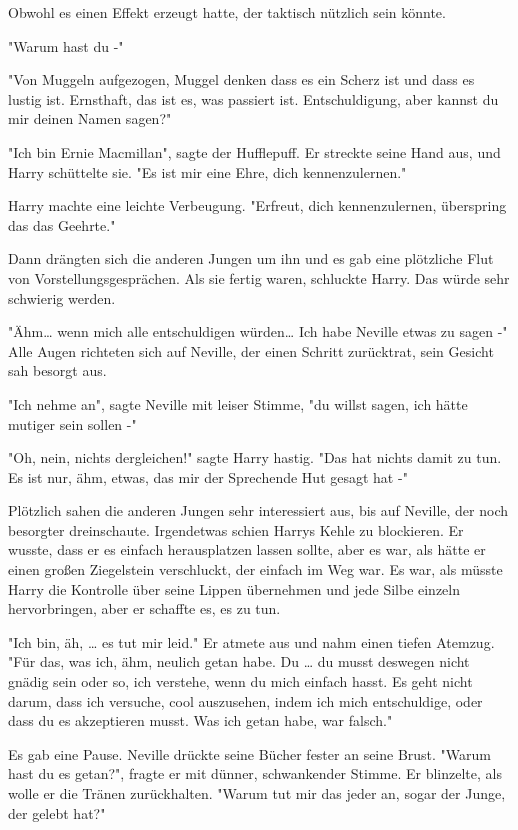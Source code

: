 {Obwohl es einen Effekt erzeugt hatte, der taktisch nützlich sein könnte.

"Warum hast du -"

"Von Muggeln aufgezogen, Muggel denken dass es ein Scherz ist und dass es lustig ist. Ernsthaft, das ist es, was passiert ist. Entschuldigung, aber kannst du mir deinen Namen sagen?"

"Ich bin Ernie Macmillan", sagte der Hufflepuff. Er streckte seine Hand aus, und Harry schüttelte sie. "Es ist mir eine Ehre, dich kennenzulernen."

Harry machte eine leichte Verbeugung. "Erfreut, dich kennenzulernen, überspring das das Geehrte."

Dann drängten sich die anderen Jungen um ihn und es gab eine plötzliche Flut von Vorstellungsgesprächen. Als sie fertig waren, schluckte Harry. Das würde sehr schwierig werden.

"Ähm… wenn mich alle entschuldigen würden… Ich habe Neville etwas zu sagen -" Alle Augen richteten sich auf Neville, der einen Schritt zurücktrat, sein Gesicht sah besorgt aus.

"Ich nehme an", sagte Neville mit leiser Stimme, "du willst sagen, ich hätte mutiger sein sollen -"

"Oh, nein, nichts dergleichen!" sagte Harry hastig. "Das hat nichts damit zu tun. Es ist nur, ähm, etwas, das mir der Sprechende Hut gesagt hat -"

Plötzlich sahen die anderen Jungen sehr interessiert aus, bis auf Neville, der noch besorgter dreinschaute. Irgendetwas schien Harrys Kehle zu blockieren. Er wusste, dass er es einfach herausplatzen lassen sollte, aber es war, als hätte er einen großen Ziegelstein verschluckt, der einfach im Weg war. Es war, als müsste Harry die Kontrolle über seine Lippen übernehmen und jede Silbe einzeln hervorbringen, aber er schaffte es, es zu tun.

"Ich bin, äh, … es tut mir leid." Er atmete aus und nahm einen tiefen Atemzug. "Für das, was ich, ähm, neulich getan habe. Du … du musst deswegen nicht gnädig sein oder so, ich verstehe, wenn du mich einfach hasst. Es geht nicht darum, dass ich versuche, cool auszusehen, indem ich mich entschuldige, oder dass du es akzeptieren musst. Was ich getan habe, war falsch."

Es gab eine Pause. Neville drückte seine Bücher fester an seine Brust. "Warum hast du es getan?", fragte er mit dünner, schwankender Stimme. Er blinzelte, als wolle er die Tränen zurückhalten. "Warum tut mir das jeder an, sogar der Junge, der gelebt hat?"

}
